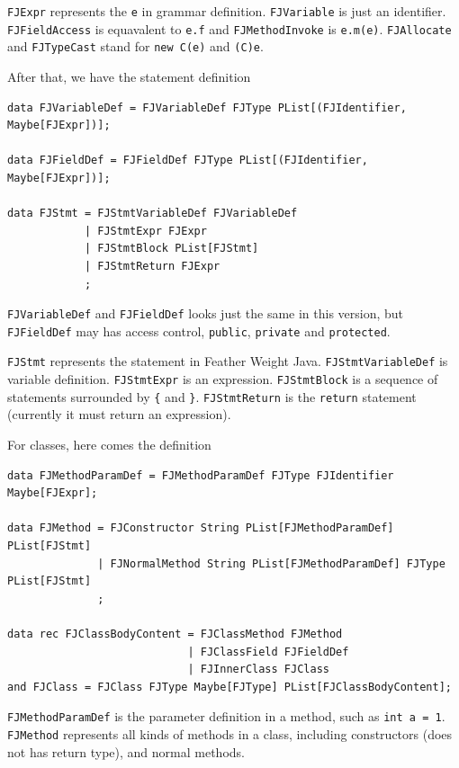 \texttt{FJExpr} represents the \texttt{e} in grammar definition. \texttt{FJVariable} is just an identifier. \texttt{FJFieldAccess} is equavalent to \texttt{e.f} and \texttt{FJMethodInvoke} is \texttt{e.m(e)}. \texttt{FJAllocate} and \texttt{FJTypeCast} stand for \texttt{new C(e)} and \texttt{(C)e}.

After that, we have the statement definition

\begin{lstlisting}
data FJVariableDef = FJVariableDef FJType PList[(FJIdentifier, Maybe[FJExpr])];

data FJFieldDef = FJFieldDef FJType PList[(FJIdentifier, Maybe[FJExpr])];

data FJStmt = FJStmtVariableDef FJVariableDef
            | FJStmtExpr FJExpr
            | FJStmtBlock PList[FJStmt]
            | FJStmtReturn FJExpr
            ;
\end{lstlisting}

\texttt{FJVariableDef} and \texttt{FJFieldDef} looks just the same in this version, but \texttt{FJFieldDef} may has access control, \texttt{public}, \texttt{private} and \texttt{protected}.

\texttt{FJStmt} represents the statement in Feather Weight Java. \texttt{FJStmtVariableDef} is variable definition. \texttt{FJStmtExpr} is an expression. \texttt{FJStmtBlock} is a sequence of statements surrounded by \texttt{\{} and \texttt{\}}. \texttt{FJStmtReturn} is the \texttt{return} statement (currently it must return an expression).

For classes, here comes the definition

\begin{lstlisting}
data FJMethodParamDef = FJMethodParamDef FJType FJIdentifier Maybe[FJExpr];

data FJMethod = FJConstructor String PList[FJMethodParamDef] PList[FJStmt]
              | FJNormalMethod String PList[FJMethodParamDef] FJType PList[FJStmt]
              ;

data rec FJClassBodyContent = FJClassMethod FJMethod
                            | FJClassField FJFieldDef
                            | FJInnerClass FJClass
and FJClass = FJClass FJType Maybe[FJType] PList[FJClassBodyContent];
\end{lstlisting}

\texttt{FJMethodParamDef} is the parameter definition in a method, such as \texttt{int a = 1}. \texttt{FJMethod} represents all kinds of methods in a class, including constructors (does not has return type), and normal methods.

